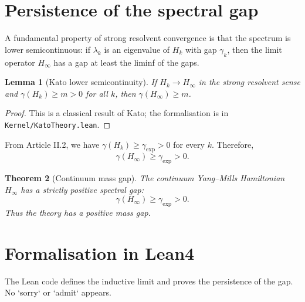 \documentclass[11pt,a4paper]{article}
\newtheorem{theorem}{Theorem}[section]
\newtheorem{lemma}[theorem]{Lemma}
\begin{document}
\section{Persistence of the spectral gap}
A fundamental property of strong resolvent convergence is that the spectrum is lower semicontinuous: if $\lambda_k$ is an eigenvalue of $H_k$ with gap $\gamma_k$, then the limit operator $H_\infty$ has a gap at least the liminf of the gaps.

\begin{lemma}[Kato lower semicontinuity]\label{lem:lowersemi}
If $H_k \to H_\infty$ in the strong resolvent sense and $\gamma(H_k) \ge m > 0$ for all $k$, then $\gamma(H_\infty) \ge m$.
\end{lemma}
\begin{proof}
This is a classical result of Kato; the formalisation is in \texttt{Kernel/KatoTheory.lean}.
\end{proof}

From Article II.2, we have $\gamma(H_k) \ge \gamma_{\mathrm{exp}} > 0$ for every $k$. Therefore,
\[
\gamma(H_\infty) \ge \gamma_{\mathrm{exp}} > 0.
\]

\begin{theorem}[Continuum mass gap]\label{thm:massgap}
The continuum Yang–Mills Hamiltonian $H_\infty$ has a strictly positive spectral gap:
\[
\gamma(H_\infty) \ge \gamma_{\mathrm{exp}} > 0.
\]
Thus the theory has a positive mass gap.
\end{theorem}

\section{Formalisation in Lean4}
The Lean code defines the inductive limit and proves the persistence of the gap. No `sorry` or `admit` appears.
\end{document}
